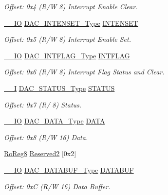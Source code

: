 \begin{DoxyCompactItemize}
\begin{DoxyCompactList}\small\item\em Offset\+: 0x4 (R/W 8) Interrupt Enable Clear. \end{DoxyCompactList}\item 
\mbox{\hyperlink{core__cm0plus_8h_aec43007d9998a0a0e01faede4133d6be}{\+\_\+\+\_\+\+IO}} \mbox{\hyperlink{union_d_a_c___i_n_t_e_n_s_e_t___type}{D\+A\+C\+\_\+\+I\+N\+T\+E\+N\+S\+E\+T\+\_\+\+Type}} \mbox{\hyperlink{struct_dac_ae3ccd37e8d31bd0b94cce784de8a3700}{I\+N\+T\+E\+N\+S\+ET}}
\begin{DoxyCompactList}\small\item\em Offset\+: 0x5 (R/W 8) Interrupt Enable Set. \end{DoxyCompactList}\item 
\mbox{\hyperlink{core__cm0plus_8h_aec43007d9998a0a0e01faede4133d6be}{\+\_\+\+\_\+\+IO}} \mbox{\hyperlink{union_d_a_c___i_n_t_f_l_a_g___type}{D\+A\+C\+\_\+\+I\+N\+T\+F\+L\+A\+G\+\_\+\+Type}} \mbox{\hyperlink{struct_dac_ab4496ba3ffab30aef60ba2dce5e689ac}{I\+N\+T\+F\+L\+AG}}
\begin{DoxyCompactList}\small\item\em Offset\+: 0x6 (R/W 8) Interrupt Flag Status and Clear. \end{DoxyCompactList}\item 
\mbox{\hyperlink{core__cm0plus_8h_af63697ed9952cc71e1225efe205f6cd3}{\+\_\+\+\_\+I}} \mbox{\hyperlink{union_d_a_c___s_t_a_t_u_s___type}{D\+A\+C\+\_\+\+S\+T\+A\+T\+U\+S\+\_\+\+Type}} \mbox{\hyperlink{struct_dac_af742ee08f000b4fa73c1513eb9501e23}{S\+T\+A\+T\+US}}
\begin{DoxyCompactList}\small\item\em Offset\+: 0x7 (R/ 8) Status. \end{DoxyCompactList}\item 
\mbox{\hyperlink{core__cm0plus_8h_aec43007d9998a0a0e01faede4133d6be}{\+\_\+\+\_\+\+IO}} \mbox{\hyperlink{union_d_a_c___d_a_t_a___type}{D\+A\+C\+\_\+\+D\+A\+T\+A\+\_\+\+Type}} \mbox{\hyperlink{struct_dac_a7148bbb7404231815d4954ef51204525}{D\+A\+TA}}
\begin{DoxyCompactList}\small\item\em Offset\+: 0x8 (R/W 16) Data. \end{DoxyCompactList}\item 
\mbox{\hyperlink{group___s_a_m_d21_e15_a__definitions_ga0d957f1433aaf5d70e4dc2b68288442d}{Ro\+Reg8}} \mbox{\hyperlink{struct_dac_a39c013121a741bab8d9442a891da19a7}{Reserved2}} \mbox{[}0x2\mbox{]}
\item 
\mbox{\hyperlink{core__cm0plus_8h_aec43007d9998a0a0e01faede4133d6be}{\+\_\+\+\_\+\+IO}} \mbox{\hyperlink{union_d_a_c___d_a_t_a_b_u_f___type}{D\+A\+C\+\_\+\+D\+A\+T\+A\+B\+U\+F\+\_\+\+Type}} \mbox{\hyperlink{struct_dac_a61da94de54928bc3cd8a54ae995d461a}{D\+A\+T\+A\+B\+UF}}
\begin{DoxyCompactList}\small\item\em Offset\+: 0xC (R/W 16) Data Buffer. \end{DoxyCompactList}\end{DoxyCompactItemize}


